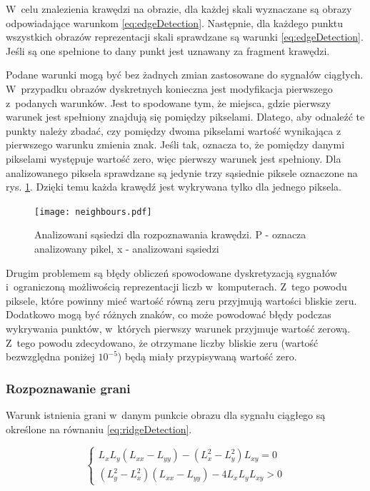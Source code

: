 W~celu znalezienia krawędzi na obrazie, dla każdej skali wyznaczane są obrazy odpowiadające warunkom \ref{eq:edgeDetection}. Następnie, dla każdego punktu wszystkich obrazów reprezentacji skali sprawdzane są warunki \ref{eq:edgeDetection}. Jeśli są one spełnione to dany punkt jest uznawany za fragment krawędzi.

Podane warunki mogą być bez żadnych zmian zastosowane do sygnałów ciągłych. W~przypadku obrazów dyskretnych konieczna jest modyfikacja pierwszego z~podanych warunków. Jest to spodowane tym, że miejsca, gdzie pierwszy warunek jest spełniony znajdują się pomiędzy pikselami. Dlatego, aby odnaleźć te punkty należy zbadać, czy pomiędzy dwoma pikselami wartość wynikająca z pierwszego warunku zmienia znak. Jeśli tak, oznacza to, że pomiędzy danymi pikselami występuje wartość zero, więc pierwszy warunek jest spełniony. Dla analizowanego piksela sprawdzane są jedynie trzy sąsiednie piksele oznaczone na rys. \ref{fig:comparePixels}. Dzięki temu każda krawędź jest wykrywana tylko dla jednego piksela.

\begin{figure}
\begin{center}
\texttt{[image: neighbours.pdf]}
\end{center}
\caption{Analizowani sąsiedzi dla rozpoznawania krawędzi. P - oznacza analizowany pikel, x - analizowani sąsiedzi}
\label{fig:comparePixels}
\end{figure}

Drugim problemem są błędy obliczeń spowodowane dyskretyzacją sygnałów i~ograniczoną możliwością reprezentacji liczb w~komputerach. Z~tego powodu piksele, które powinny mieć wartość równą zeru przyjmują wartości bliskie zeru. Dodatkowo mogą być różnych znaków, co może powodować błędy podczas wykrywania punktów, w~których pierwszy warunek przyjmuje wartość zerową. Z~tego powodu zdecydowano, że otrzymane liczby bliskie zeru (wartość bezwzględna poniżej $ 10^{-5} $) będą miały przypisywaną wartość zero.


\subsubsection{Rozpoznawanie grani}
\label{subsubsec:rozpoznawanieGrani}

Warunk istnienia grani w~danym punkcie obrazu dla sygnału ciągłego są określone na równaniu \ref{eq:ridgeDetection}.

\begin{equation}
\label{eq:ridgeDetection}
\left\{ \begin{array}{rl}
L_xL_y(L_{xx}-L_{yy}) - (L_x^2 - L_y^2)L_{xy} = 0 \\
(L_y^2 - L_x^2)(L_{xx} - L_{yy}) - 4 L_xL_yL_{xy} > 0
\end{array} \right.
\end{equation}

